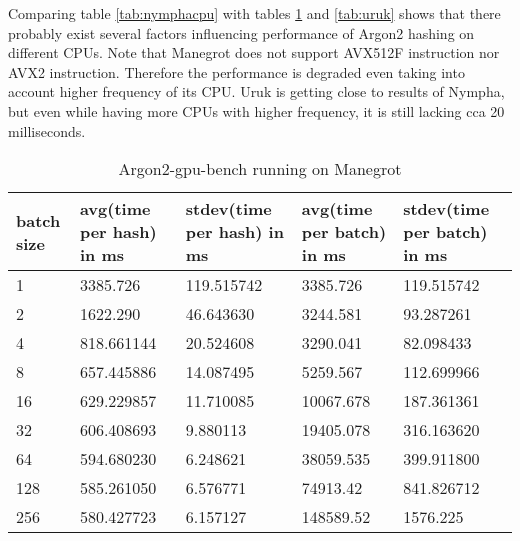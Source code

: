 \documentclass[nolof]{fithesis3}
\begin{document}
\FloatBarrier

Comparing table \ref{tab:nymphacpu} with tables \ref{tab:manegrot} and \ref{tab:uruk} shows that there probably exist several factors influencing performance of Argon2 hashing on different CPUs. Note that Manegrot does not support AVX512F instruction nor AVX2 instruction. Therefore the performance is degraded even taking into account higher frequency of its CPU. Uruk is getting close to results of Nympha, but even while having more CPUs with higher frequency, it is still lacking cca 20 milliseconds.

\FloatBarrier

\noindent
\begin{table}
\caption{Argon2-gpu-bench running on Manegrot}
\label{tab:manegrot}
\begin{tabularx}{\textwidth}{| X | X | X | X | X |}
\hline
batch size & avg(time per hash) in ms & stdev(time per hash) in ms & avg(time per batch) in ms & stdev(time per batch) in ms\\
\hline
1 & 3385.726 & 119.515742 & 3385.726 & 119.515742\\
\hline
2 & 1622.290 & 46.643630 & 3244.581 & 93.287261\\
\hline
4 & 818.661144 & 20.524608 & 3290.041 & 82.098433\\
\hline
8 & 657.445886 & 14.087495 & 5259.567 & 112.699966\\
\hline
16 & 629.229857 & 11.710085 & 10067.678 & 187.361361\\
\hline
32 & 606.408693 & 9.880113 & 19405.078 & 316.163620\\
\hline
64 & 594.680230 & 6.248621 & 38059.535 & 399.911800\\
\hline
128 & 585.261050 & 6.576771 & 74913.42 & 841.826712\\
\hline
256 & 580.427723 & 6.157127 & 148589.52 & 1576.225\\
\hline
\end{tabularx}
\end{table}
\end{document}
